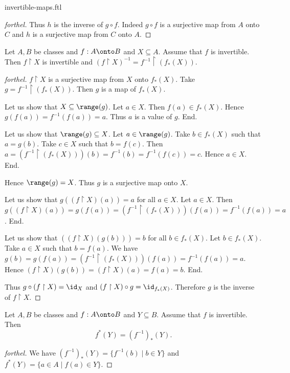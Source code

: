 \documentclass{naproche-library}
\begin{document}
\begin{smodule}{invertible-maps.ftl}
\begin{proof}[forthel]
    Thus $h$ is the inverse of $g \circ f$.
    Indeed $g \circ f$ is a surjective map from $A$ onto $C$ and $h$ is a surjective map from $C$ onto $A$.
  \end{proof}

  \begin{proposition}[forthel,id=FOUNDATIONS_09_6374884963778560]
    Let $A, B$ be classes and $f : A \onto B$ and $X \subseteq A$.
    Assume that $f$ is invertible.
    Then $f \restriction X$ is invertible and $(f\restriction X)^{-1} = f^{-1} \restriction (f_{*}(X))$.
  \end{proposition}
  \begin{proof}[forthel]
    $f \restriction X$ is a surjective map from $X$ onto $f_{*}(X)$.
    Take $g = f^{-1} \restriction (f_{*}(X))$.
    Then $g$ is a map of $f_{*}(X)$.

    Let us show that $X \subseteq \range(g)$.
      Let $a \in X$.
      Then $f(a) \in f_{*}(X)$.
      Hence $g(f(a)) = f^{-1}(f(a)) = a$.
      Thus $a$ is a value of $g$.
    End.

    Let us show that $\range(g) \subseteq X$.
      Let $a \in \range(g)$.
      Take $b \in f_{*}(X)$ such that $a = g(b)$.
      Take $c \in X$ such that $b = f(c)$.
      Then $a
        = (f^{-1} \restriction (f_{*}(X)))(b)
        = f^{-1}(b)
        = f^{-1}(f(c))
        = c$.
      Hence $a \in X$.
    End.

    Hence $\range(g) = X$.
    Thus $g$ is a surjective map onto $X$.

    Let us show that $g((f \restriction X)(a)) = a$ for all $a \in X$.
      Let $a \in X$.
      Then $g((f \restriction X)(a))
        = g(f(a))
        = (f^{-1} \restriction (f_{*}(X)))(f(a))
        = f^{-1}(f(a))
        = a$.
    End.

    Let us show that $((f \restriction X)(g(b))) = b$ for all $b \in f_{*}(X)$.
      Let $b \in f_{*}(X)$.
      Take $a \in X$ such that $b = f(a)$.
      We have $g(b)
        = g(f(a))
        = (f^{-1} \restriction (f_{*}(X)))(f(a))
        = f^{-1}(f(a))
        = a$.
      Hence $(f \restriction X)(g(b))
        = (f \restriction X)(a)
        = f(a)
        = b$.
    End.

    Thus $g \circ (f \restriction X) = \id_{X}$ and $(f \restriction X) \circ g = \id_{f_{*}(X)}$.
    Therefore $g$ is the inverse of $f \restriction X$.
  \end{proof}

  \begin{proposition}[forthel,id=FOUNDATIONS_09_7726021377785856]
    Let $A, B$ be classes and $f : A \onto B$ and $Y \subseteq B$.
    Assume that $f$ is invertible.
    Then \[ f^{*}(Y) = (f^{-1})_{*}(Y). \]
  \end{proposition}
  \begin{proof}[forthel]
    We have $(f^{-1})_{*}(Y) = \{ f^{-1}(b) \mid b \in Y \}$ and $f^{*}(Y) = \{ a \in A \mid f(a) \in Y \}$.


\end{proof}
\end{smodule}
\end{document}

